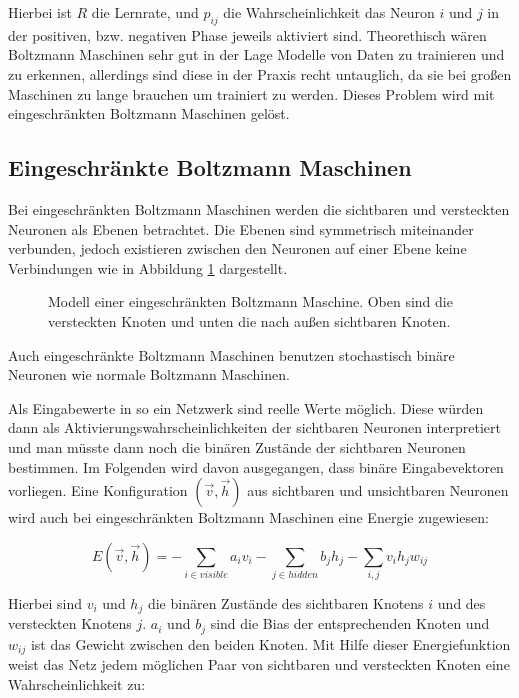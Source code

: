 \documentclass[12pt]{article}
\begin{document}
Hierbei ist $R$ die Lernrate, und $p_{ij}$ die Wahrscheinlichkeit das Neuron $i$ und $j$ in der positiven, bzw. negativen Phase jeweils aktiviert sind.
Theorethisch wären Boltzmann Maschinen sehr gut in der Lage Modelle von Daten zu trainieren und zu erkennen, allerdings sind diese in der Praxis recht untauglich, da sie bei großen Maschinen zu lange brauchen um trainiert zu werden. Dieses Problem wird mit eingeschränkten Boltzmann Maschinen gelöst.

\subsection{Eingeschränkte Boltzmann Maschinen}	
Bei eingeschränkten Boltzmann Maschinen werden die sichtbaren und versteckten Neuronen als Ebenen betrachtet. Die Ebenen sind symmetrisch miteinander verbunden, jedoch existieren zwischen den Neuronen auf einer Ebene keine Verbindungen wie in Abbildung \ref{RBM} dargestellt.

\begin{figure}[H]
	\center
	
	\caption{Modell einer eingeschränkten Boltzmann Maschine. Oben sind die versteckten Knoten und unten die nach außen sichtbaren Knoten.}
	\label{RBM}
	\end{figure}
	
Auch eingeschränkte Boltzmann Maschinen benutzen stochastisch binäre Neuronen wie normale Boltzmann Maschinen.


Als Eingabewerte in so ein Netzwerk sind reelle Werte möglich. Diese würden dann als Aktivierungswahrscheinlichkeiten der sichtbaren Neuronen interpretiert und man müsste dann noch die binären Zustände der sichtbaren Neuronen bestimmen. Im Folgenden wird davon ausgegangen, dass binäre Eingabevektoren vorliegen. 
Eine Konfiguration $(\vec{v},\vec{h})$ aus sichtbaren und unsichtbaren Neuronen wird auch bei eingeschränkten Boltzmann Maschinen eine Energie zugewiesen:

\begin{equation}
E(\vec{v},\vec{h})= - \sum_{i \in visible} a_iv_i- \sum_{j \in hidden} b_j h_j - \sum_{i,j} v_i h_j w_{ij}
\end{equation}

Hierbei sind $v_i$ und $h_j$ die binären Zustände des sichtbaren Knotens $i$ und des versteckten Knotens $j$. $a_i$ und $b_j$ sind die Bias der entsprechenden Knoten und $w_{ij}$ ist das Gewicht zwischen den beiden Knoten. Mit Hilfe dieser Energiefunktion weist das Netz jedem möglichen Paar von sichtbaren und versteckten Knoten eine Wahrscheinlichkeit zu:
\end{document}
